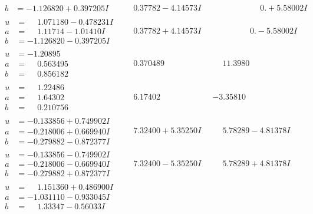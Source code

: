 \documentclass[1p]{elsarticle_modified}
\theoremstyle{definition}
\begin{document}
$$\begin{array}{c|c|c}
\begin{aligned}
b &= -1.126820 + 0.397205 I\end{aligned}
 & \phantom{-}0.37782 - 4.14573 I & \phantom{-0.000000 -}0. + 5.58002 I \\ \hline\begin{aligned}
u &= \phantom{-}1.071180 - 0.478231 I \\
a &= \phantom{-}1.11714 - 1.01410 I \\
b &= -1.126820 - 0.397205 I\end{aligned}
 & \phantom{-}0.37782 + 4.14573 I & \phantom{-0.000000 } 0. - 5.58002 I \\ \hline\begin{aligned}
u &= -1.20895\phantom{ +0.000000I} \\
a &= \phantom{-}0.563495\phantom{ +0.000000I} \\
b &= \phantom{-}0.856182\phantom{ +0.000000I}\end{aligned}
 & \phantom{-}0.370489\phantom{ +0.000000I} & \phantom{-}11.3980\phantom{ +0.000000I} \\ \hline\begin{aligned}
u &= \phantom{-}1.22486\phantom{ +0.000000I} \\
a &= \phantom{-}1.64302\phantom{ +0.000000I} \\
b &= \phantom{-}0.210756\phantom{ +0.000000I}\end{aligned}
 & \phantom{-}6.17402\phantom{ +0.000000I} & -3.35810\phantom{ +0.000000I} \\ \hline\begin{aligned}
u &= -0.133856 + 0.749902 I \\
a &= -0.218006 + 0.669940 I \\
b &= -0.279882 - 0.872377 I\end{aligned}
 & \phantom{-}7.32400 + 5.35250 I & \phantom{-}5.78289 - 4.81378 I \\ \hline\begin{aligned}
u &= -0.133856 - 0.749902 I \\
a &= -0.218006 - 0.669940 I \\
b &= -0.279882 + 0.872377 I\end{aligned}
 & \phantom{-}7.32400 - 5.35250 I & \phantom{-}5.78289 + 4.81378 I \\ \hline\begin{aligned}
u &= \phantom{-}1.151360 + 0.486900 I \\
a &= -1.031110 - 0.933045 I \\
b &= \phantom{-}1.33347 - 0.56033 I\end{aligned}

\end{array}$$
\end{document}

